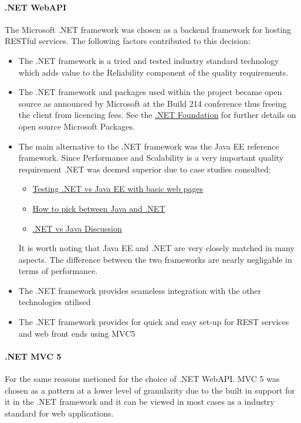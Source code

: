 \documentclass[11pt,a4paper,titlepage]{article}
\begin{document}
			\paragraph{.NET WebAPI}
				The Microsoft .NET framework was chosen as a backend framework for hosting RESTful services. The following factors contributed to this decision:
				\begin{itemize}
					\item The .NET framework is a tried and tested industry standard technology which adds value to the Reliability component of the 
							quality requirements.
					\item The .NET framework and packages used within the project became open source as announced by Microsoft at the Build 214 conference thus freeing the client from licencing fees. See the \href{http://www.dotnetfoundation.org/projects}{.NET Foundation}  for further details on open source Microsoft Packages.
					\item The main alternative to the .NET framework was the Java EE reference framework. Since Performance and Scalability is a very important quality requirement .NET was deemed superior due to case studies consulted:
							\begin{itemize}
								\item  \href{http://www.slideshare.net/tejasvirastogi/java-vs-net-24443514}{Testing .NET vs Java EE with basic web pages}
								\item  \href{http://www.seguetech.com/blog/2013/06/03/dotnet-vs-java-how-to-pick}{How to pick between Java and .NET}
								\item  \href{http://stackoverflow.com/questions/18088/are-there-any-studies-comparing-java-ee-vs-net}{.NET vs Java Discussion}
							\end{itemize}
							It is worth noting that Java EE and .NET are very closely matched in many aspects. The difference between the two frameworks are nearly negligable in terms of performance.
					\item The .NET framework provides seameless integration with the other technologies utilised
					\item The .NET framework provides for quick and easy set-up for REST services and web front ends using MVC5		
				\end{itemize}
			\paragraph{.NET MVC 5}
				For the same reasons metioned for the choice of .NET WebAPI. MVC 5 was chosen as a pattern at a lower level of granularity due to the built in support for it in the .NET framework and it can be viewed in most cases as a industry standard for web applications.
\end{document}
